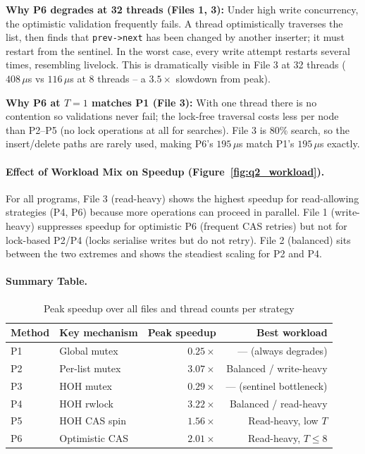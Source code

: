 \documentclass{article}
\begin{document}
\textbf{Why P6 degrades at 32 threads (Files 1, 3):} Under high write
concurrency, the optimistic validation frequently fails. A thread
optimistically traverses the list, then finds that \texttt{prev->next}
has been changed by another inserter; it must restart from the sentinel.
In the worst case, every write attempt restarts several times, resembling
livelock. This is dramatically visible in File 3 at 32 threads
($408\,\mu$s vs $116\,\mu$s at 8 threads -- a $3.5\times$ slowdown from peak).

\textbf{Why P6 at $T=1$ matches P1 (File 3):} With one thread there is no
contention so validations never fail; the lock-free traversal costs less
per node than P2--P5 (no lock operations at all for searches). File 3 is
80\% search, so the insert/delete paths are rarely used, making P6's
$195\,\mu$s match P1's $195\,\mu$s exactly.

\paragraph{Effect of Workload Mix on Speedup (Figure~\ref{fig:q2_workload}).}

For all programs, File 3 (read-heavy) shows the highest speedup for
read-allowing strategies (P4, P6) because more operations can proceed in
parallel. File 1 (write-heavy) suppresses speedup for optimistic P6
(frequent CAS retries) but not for lock-based P2/P4 (locks serialise
writes but do not retry). File 2 (balanced) sits between the two extremes
and shows the steadiest scaling for P2 and P4.

\paragraph{Summary Table.}

\begin{table}[H]
\centering
\caption{Peak speedup over all files and thread counts per strategy}
\begin{tabular}{llrr}
\toprule
Method & Key mechanism & Peak speedup & Best workload \\
\midrule
P1 & Global mutex      & $0.25\times$ & --- (always degrades) \\
P2 & Per-list mutex    & $3.07\times$ & Balanced / write-heavy \\
P3 & HOH mutex         & $0.29\times$ & --- (sentinel bottleneck) \\
P4 & HOH rwlock        & $3.22\times$ & Balanced / read-heavy \\
P5 & HOH CAS spin      & $1.56\times$ & Read-heavy, low $T$ \\
P6 & Optimistic CAS    & $2.01\times$ & Read-heavy, $T \leq 8$ \\
\bottomrule
\end{tabular}
\end{table}
\end{document}
